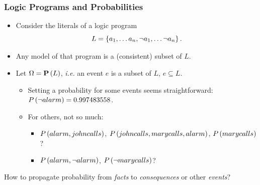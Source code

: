 \documentclass[bigger,xcolor={x11names,svgnames}]{beamer}
\begin{document}
\begin{frame}
    \frametitle{Logic Programs and Probabilities}
    \vfill
    \begin{itemize}
        \item Consider the literals of a logic program $$L = \set{a_1, \ldots a_n, \neg a_1, \ldots \neg a_n}.$$
        \item Any model of that program is a (consistent) subset of $L$.
        \item Let $\Omega = \mathbf{P}\del{L}$, \emph{i.e.} an \alert{event} $e$ is a subset of $L$, $e \subseteq L$.
              \begin{itemize}
                  \item Setting a probability for some events seems straightforward: $P\del{\neg alarm} = 0.997483558$.
                  \item For others, not so much:
                        \begin{itemize}
                            \item $P\del{alarm, johncalls}$, $P\del{johncalls, marycalls, alarm}$, $P\del{marycalls}$?
                            \item $P\del{alarm, \neg alarm}$, $P\del{\neg marycalls}$?
                        \end{itemize}
              \end{itemize}
    \end{itemize}
    \vfill
    \begin{center}
        How to \alert{propagate} probability from \emph{facts} to \emph{consequences} or other \emph{events}?
    \end{center}
\end{frame}
%
\end{document}
